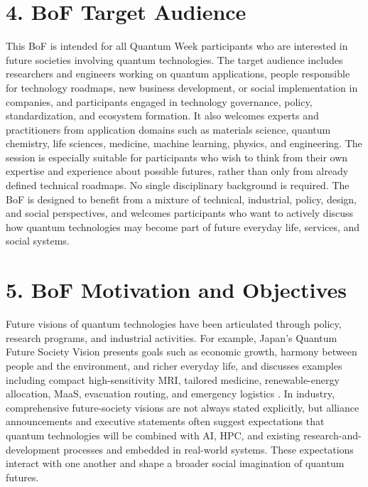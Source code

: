\documentclass[10pt,conference]{IEEEtran}
\begin{document}
\section*{4. BoF Target Audience}

This BoF is intended for all Quantum Week participants who are interested in future societies involving quantum technologies. The target audience includes researchers and engineers working on quantum applications, people responsible for technology roadmaps, new business development, or social implementation in companies, and participants engaged in technology governance, policy, standardization, and ecosystem formation. It also welcomes experts and practitioners from application domains such as materials science, quantum chemistry, life sciences, medicine, machine learning, physics, and engineering. The session is especially suitable for participants who wish to think from their own expertise and experience about possible futures, rather than only from already defined technical roadmaps. No single disciplinary background is required. The BoF is designed to benefit from a mixture of technical, industrial, policy, design, and social perspectives, and welcomes participants who want to actively discuss how quantum technologies may become part of future everyday life, services, and social systems.

\section*{5. BoF Motivation and Objectives}

Future visions of quantum technologies have been articulated through policy, research programs, and industrial activities. For example, Japan's Quantum Future Society Vision presents goals such as economic growth, harmony between people and the environment, and richer everyday life, and discusses examples including compact high-sensitivity MRI, tailored medicine, renewable-energy allocation, MaaS, evacuation routing, and emergency logistics \cite{quantum_future_society_vision}. In industry, comprehensive future-society visions are not always stated explicitly, but alliance announcements and executive statements often suggest expectations that quantum technologies will be combined with AI, HPC, and existing research-and-development processes and embedded in real-world systems. These expectations interact with one another and shape a broader social imagination of quantum futures.
\end{document}
